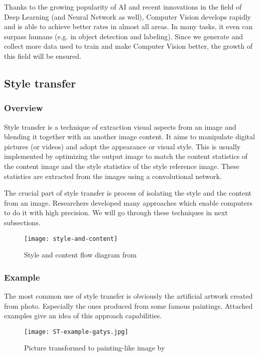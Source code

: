 \documentclass[../Main.tex]{subfiles}
\begin{document}
    Thanks to the growing popularity of AI and recent innovations in the field of Deep Learning (and Neural Network as well), Computer Vision develops rapidly and is able to achieve better rates in almost all areas. In many tasks, it even can surpass humans (e.g. in object detection and labeling). Since we generate and collect more data used to train and make Computer Vision better, the growth of this field will be ensured. 

\subsection{Style transfer}
    \subsubsection{Overview}
    Style transfer is a technique of extraction visual aspects from an image and blending it together with an another image content. It aims to manipulate digital pictures (or videos) and adopt the appearance or visual style. This is usually implemented by optimizing the output image to match the content statistics of the content image and the style statistics of the style reference image. These statistics are extracted from the images using a convolutional network. 
    
    The crucial part of style transfer is process of isolating the style and the content from an image. Researchers developed many approaches which enable computers to do it with high precision. We will go through these techniques in next subsections. \\
    \begin{figure}[h]
        \centering
        \texttt{[image: style-and-content]}
        \caption{Style and content flow diagram from \cite{ulyanov2016instance}}
        \label{fig:style-and-content}
    \end{figure}
    
        
\newpage
    
    \subsubsection{Example}
    The most common use of style transfer is obviously the artificial artwork created from photo. Especially the ones produced from some famous paintings. Attached examples give an idea of this approach capabilities. \\
    \begin{figure}[h!]
        \centering
        \texttt{[image: ST-example-gatys.jpg]}
        \caption{Picture transformed to painting-like image by \cite{gatys2015neural}}
        \label{fig:ST-example-gatys}
    \end{figure}
\end{document}
